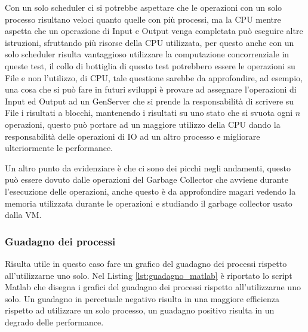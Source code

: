 Con un solo scheduler ci si potrebbe aspettare che
le operazioni con un solo processo risultano veloci quanto
quelle con più processi, ma la CPU mentre aspetta
che un operazione di Input e Output venga completata
può eseguire altre istruzioni, sfruttando più risorse della CPU utilizzata,
per questo anche con un solo scheduler risulta vantaggioso
utilizzare la computazione concorrenziale in queste test,
il collo di bottiglia
di questo test potrebbero essere le operazioni su File e non l'utilizzo,
di CPU, tale questione sarebbe da approfondire, ad esempio,
una cosa che si può fare in futuri sviluppi è 
provare ad assegnare l'operazioni di Input ed Output ad un GenServer
che si prende la responsabilità di scrivere su File i risultati
a blocchi, mantenendo i risultati su uno stato che si svuota ogni
$n$ operazioni, questo può portare ad un maggiore utilizzo della CPU
dando la responsabilità delle operazioni di IO ad un altro processo
e migliorare ulteriormente le performance.

Un altro punto da evidenziare è che ci sono dei picchi negli
andamenti, questo può essere dovuto dalle operazioni
del Garbage Collector che avviene durante l'esecuzione
delle operazioni, anche questo è da approfondire magari
vedendo la memoria utilizzata durante le operazioni
e studiando il garbage collector usato dalla VM.

\subsubsection{Guadagno dei processi}

Risulta utile in questo caso fare un grafico del guadagno dei
processi rispetto all'utilizzarne uno solo. Nel Listing \ref{lst:guadagno_matlab}
è riportato lo script Matlab che disegna i grafici del guadagno
dei processi rispetto all'utilizzarne uno solo.
Un guadagno in percetuale negativo risulta in una maggiore efficienza
rispetto ad utilizzare un solo processo, un guadagno positivo
risulta in un degrado delle performance.

